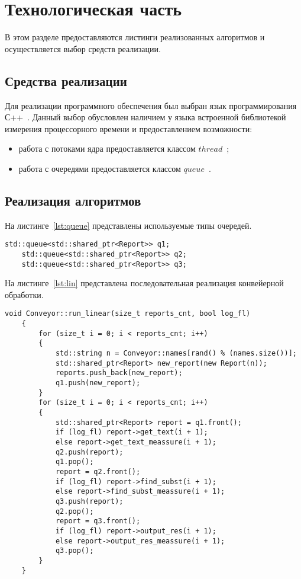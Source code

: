 \chapter{Технологическая часть}

В этом разделе предоставляются листинги реализованных алгоритмов и осуществляется выбор средств реализации.

\section{Средства реализации}

Для реализации программного обеспечения был выбран язык программирования С++~\cite{C++}.
Данный выбор обусловлен  наличием у языка встроенной библиотекой измерения процессорного времени и предоставлением возможности:
\begin{itemize}
	\item работа с потоками ядра предоставляется классом $thread$~\cite{thread};
	\item работа с очередями предоставляется классом $queue$~\cite{queue}.
\end{itemize}

\section{Реализация алгоритмов}

На листинге~\ref{lst:queue} представлены используемые типы очередей.

\begin{lstlisting}[label=lst:queue,caption=Реализация последовательной конвейерной обработки]
	std::queue<std::shared_ptr<Report>> q1;
	std::queue<std::shared_ptr<Report>> q2;
	std::queue<std::shared_ptr<Report>> q3;
\end{lstlisting}

\clearpage

На листинге~\ref{lst:lin} представлена последовательная реализация конвейерной обработки.

\begin{lstlisting}[label=lst:lin,caption=Реализация последовательной конвейерной обработки]
	void Conveyor::run_linear(size_t reports_cnt, bool log_fl) 
	{
		for (size_t i = 0; i < reports_cnt; i++)
		{
			std::string n = Conveyor::names[rand() % (names.size())];
			std::shared_ptr<Report> new_report(new Report(n));
			reports.push_back(new_report);
			q1.push(new_report);
		}
		for (size_t i = 0; i < reports_cnt; i++) 
		{
			std::shared_ptr<Report> report = q1.front();
			if (log_fl) report->get_text(i + 1);
			else report->get_text_meassure(i + 1);
			q2.push(report);
			q1.pop();
			report = q2.front();
			if (log_fl) report->find_subst(i + 1);
			else report->find_subst_meassure(i + 1);
			q3.push(report);
			q2.pop();
			report = q3.front();
			if (log_fl) report->output_res(i + 1);
			else report->output_res_meassure(i + 1);
			q3.pop();
		}
	}
\end{lstlisting}

